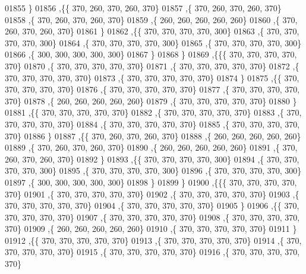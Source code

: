 \begin{DoxyCode}
01855    \}
01856   ,\{\{   370,   260,   370,   260,   370\}
01857    ,\{   370,   260,   370,   260,   370\}
01858    ,\{   370,   260,   370,   260,   370\}
01859    ,\{   260,   260,   260,   260,   260\}
01860    ,\{   370,   260,   370,   260,   370\}
01861    \}
01862   ,\{\{   370,   370,   370,   370,   300\}
01863    ,\{   370,   370,   370,   370,   300\}
01864    ,\{   370,   370,   370,   370,   300\}
01865    ,\{   370,   370,   370,   370,   300\}
01866    ,\{   300,   300,   300,   300,   300\}
01867    \}
01868   \}
01869  ,\{\{\{   370,   370,   370,   370,   370\}
01870    ,\{   370,   370,   370,   370,   370\}
01871    ,\{   370,   370,   370,   370,   370\}
01872    ,\{   370,   370,   370,   370,   370\}
01873    ,\{   370,   370,   370,   370,   370\}
01874    \}
01875   ,\{\{   370,   370,   370,   370,   370\}
01876    ,\{   370,   370,   370,   370,   370\}
01877    ,\{   370,   370,   370,   370,   370\}
01878    ,\{   260,   260,   260,   260,   260\}
01879    ,\{   370,   370,   370,   370,   370\}
01880    \}
01881   ,\{\{   370,   370,   370,   370,   370\}
01882    ,\{   370,   370,   370,   370,   370\}
01883    ,\{   370,   370,   370,   370,   370\}
01884    ,\{   370,   370,   370,   370,   370\}
01885    ,\{   370,   370,   370,   370,   370\}
01886    \}
01887   ,\{\{   370,   260,   370,   260,   370\}
01888    ,\{   260,   260,   260,   260,   260\}
01889    ,\{   370,   260,   370,   260,   370\}
01890    ,\{   260,   260,   260,   260,   260\}
01891    ,\{   370,   260,   370,   260,   370\}
01892    \}
01893   ,\{\{   370,   370,   370,   370,   300\}
01894    ,\{   370,   370,   370,   370,   300\}
01895    ,\{   370,   370,   370,   370,   300\}
01896    ,\{   370,   370,   370,   370,   300\}
01897    ,\{   300,   300,   300,   300,   300\}
01898    \}
01899   \}
01900  ,\{\{\{   370,   370,   370,   370,   370\}
01901    ,\{   370,   370,   370,   370,   370\}
01902    ,\{   370,   370,   370,   370,   370\}
01903    ,\{   370,   370,   370,   370,   370\}
01904    ,\{   370,   370,   370,   370,   370\}
01905    \}
01906   ,\{\{   370,   370,   370,   370,   370\}
01907    ,\{   370,   370,   370,   370,   370\}
01908    ,\{   370,   370,   370,   370,   370\}
01909    ,\{   260,   260,   260,   260,   260\}
01910    ,\{   370,   370,   370,   370,   370\}
01911    \}
01912   ,\{\{   370,   370,   370,   370,   370\}
01913    ,\{   370,   370,   370,   370,   370\}
01914    ,\{   370,   370,   370,   370,   370\}
01915    ,\{   370,   370,   370,   370,   370\}
01916    ,\{   370,   370,   370,   370,   370\}

\end{DoxyCode}
